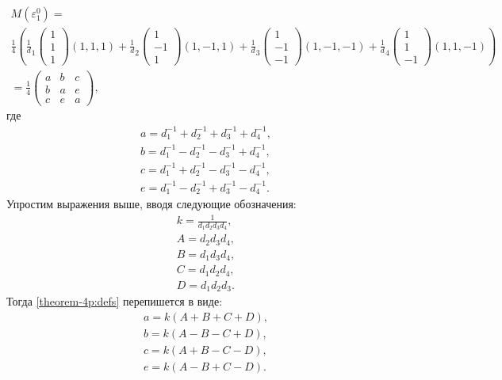	\begin{multline*}
		M(\varepsilon_1^0) = \\ 
		\frac 1 4 \left(
			\frac 1 d_1 \begin{pmatrix} 1 \\ 1 \\ 1 \end{pmatrix} (1, 1, 1) + 
			\frac 1 d_2 \begin{pmatrix} 1 \\ -1 \\ 1 \end{pmatrix} (1, -1, 1) + 
			\frac 1 d_3 \begin{pmatrix} 1 \\ -1 \\ -1 \end{pmatrix} (1, -1, -1) +
			\frac 1 d_4 \begin{pmatrix} 1 \\ 1 \\ -1 \end{pmatrix} (1, 1, -1)
		\right) \\ =
		\frac 1  4
		\begin{pmatrix}
			a & b & c \\
			b & a & e \\
			c & e & a
		\end{pmatrix},
	\end{multline*}
	где
	\begin{equation}\label{theorem-4p:defs} \begin{split}
		a=d_1^{-1}+d_2^{-1}+d_3^{-1} + d_4^{-1},\\
		b=d_1^{-1}-d_2^{-1}-d_3^{-1} + d_4^{-1},\\
		c=d_1^{-1}+d_2^{-1}-d_3^{-1} - d_4^{-1},\\
		e=d_1^{-1}-d_2^{-1}+d_3^{-1} - d_4^{-1}.
	\end{split}\end{equation}
	Упростим выражения выше, вводя следующие обозначения:
	\begin{equation}\label{theorem-4p:defs-defs} \begin{split}
		k = \frac 1 {d_1 d_2 d_3 d_4}, \\ 
		A = d_2 d_3 d_4, \\
		B = d_1 d_3 d_4, \\
		C = d_1 d_2 d_4, \\
		D = d_1 d_2 d_3.
	\end{split}\end{equation}
	Тогда \eqref{theorem-4p:defs} перепишется в виде:
	\begin{equation} \begin{split}
		a = k (A + B + C + D), \\
		b = k (A - B - C + D), \\
		c = k (A + B - C - D), \\
		e = k (A - B + C - D).
	\end{split} \end{equation}
	
